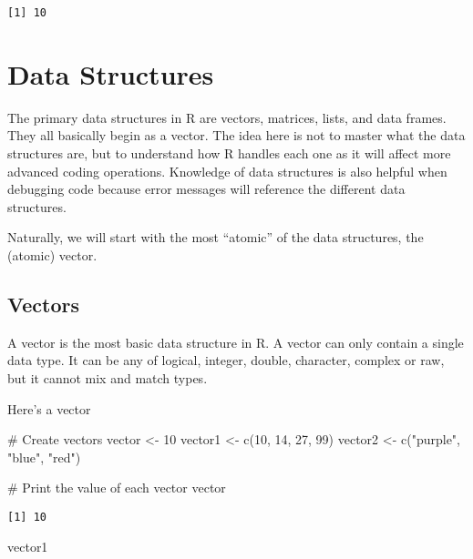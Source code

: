 \documentclass[
  letterpaper,
  DIV=11,
  numbers=noendperiod]{scrreprt}
\newenvironment{Shaded}{\begin{snugshade}}{\end{snugshade}}
\newcommand{\CommentTok}[1]{\textcolor[rgb]{0.37,0.37,0.37}{#1}}
\newcommand{\DecValTok}[1]{\textcolor[rgb]{0.68,0.00,0.00}{#1}}
\newcommand{\FunctionTok}[1]{\textcolor[rgb]{0.28,0.35,0.67}{#1}}
\newcommand{\NormalTok}[1]{\textcolor[rgb]{0.00,0.23,0.31}{#1}}
\newcommand{\OtherTok}[1]{\textcolor[rgb]{0.00,0.23,0.31}{#1}}
\newcommand{\StringTok}[1]{\textcolor[rgb]{0.13,0.47,0.30}{#1}}
\begin{document}
\begin{verbatim}
[1] 10
\end{verbatim}

\section{Data Structures}\label{data-structures}

The primary data structures in R are vectors, matrices, lists, and data
frames. They all basically begin as a vector. The idea here is not to
master what the data structures are, but to understand how R handles
each one as it will affect more advanced coding operations. Knowledge of
data structures is also helpful when debugging code because error
messages will reference the different data structures.

Naturally, we will start with the most ``atomic'' of the data
structures, the (atomic) vector.

\subsection{Vectors}\label{vectors}

A vector is the most basic data structure in R. A vector can only
contain a single data type. It can be any of logical, integer, double,
character, complex or raw, but it cannot mix and match types.

Here's a vector

\begin{Shaded}
\begin{Highlighting}[]
\CommentTok{\# Create vectors}
\NormalTok{vector }\OtherTok{\textless{}{-}} \DecValTok{10}
\NormalTok{vector1 }\OtherTok{\textless{}{-}} \FunctionTok{c}\NormalTok{(}\DecValTok{10}\NormalTok{, }\DecValTok{14}\NormalTok{, }\DecValTok{27}\NormalTok{, }\DecValTok{99}\NormalTok{)}
\NormalTok{vector2 }\OtherTok{\textless{}{-}} \FunctionTok{c}\NormalTok{(}\StringTok{"purple"}\NormalTok{, }\StringTok{"blue"}\NormalTok{, }\StringTok{"red"}\NormalTok{)}

\CommentTok{\# Print the value of each vector }
\NormalTok{vector}
\end{Highlighting}
\end{Shaded}

\begin{verbatim}
[1] 10
\end{verbatim}

\begin{Shaded}
\begin{Highlighting}[]
\NormalTok{vector1}
\end{Highlighting}
\end{Shaded}
\end{document}

